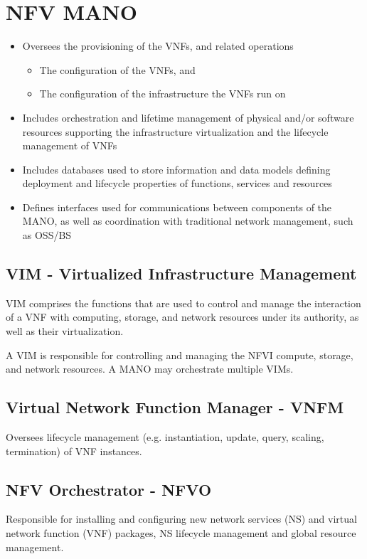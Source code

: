 \section{NFV MANO}
\begin{itemize}
   \item Oversees the provisioning of the VNFs,
   and related operations
   \begin{itemize}
      \item The configuration of the VNFs, and
      \item The configuration of the infrastructure the VNFs run on
   \end{itemize}
   \item Includes orchestration and lifetime management of physical and/or software resources supporting the infrastructure virtualization and the lifecycle management of VNFs
   \item Includes databases used to store information and data models defining deployment and lifecycle properties of functions, services and resources
   \item Defines interfaces used for communications between components of the MANO, as well as coordination with traditional network management, such as OSS/BS
\end{itemize}

\subsection*{VIM - Virtualized Infrastructure
Management}
VIM comprises the functions that are used to control and manage the interaction of a VNF with computing, storage, and network resources under its authority, as well as their virtualization.

A VIM is responsible for controlling and managing the NFVI compute, storage, and network resources. A MANO may orchestrate multiple VIMs.

\subsection*{Virtual Network Function
Manager - VNFM}
Oversees lifecycle management (e.g. instantiation, update, query, scaling, termination) of VNF instances.

\subsection*{NFV Orchestrator - NFVO}
Responsible for installing and configuring new network services (NS) and virtual network function (VNF) packages, NS lifecycle management and global resource management.